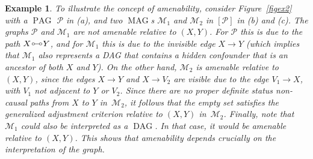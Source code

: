 \documentclass[11pt,a4paper]{article}
\newtheorem{example}{Example}
\DeclareMathOperator{\DAG}{DAG}
\DeclareMathOperator{\MAG}{MAG}
\DeclareMathOperator{\PAG}{PAG}
\newcommand{\g}[1][G]{\mathcal{#1}}
\newcommand{\circcirc}{
  \setlength{\unitlength}{1mm}
  \begin{picture}(5,1)(0,0)
    \put(1,1){\circle{1}}
    \put(1.5,1){\line(1,0){2}}
    \put(4,1){\circle{1}}
  \end{picture}
}
\begin{document}
\begin{example}
   To illustrate the concept of amenability, consider Figure~\ref{figex2} with a $\PAG$ $\g[P]$ in (a), and two $\MAG$s $\g[M]_1$ and $\g[M]_2$ in $[\g[P]]$ in (b) and (c). The graphs $\g[P]$ and $\g[M]_1$ are not amenable relative to $(X,Y)$. For $\g[P]$ this is due to the path $X \circcirc Y$, and for $\g[M]_1$ this is due to the invisible edge $X \to Y$  
   (which implies that $\g[M]_1$ also represents a DAG that contains a hidden confounder that is an ancestor of both $X$ and $Y$). On the other hand, $\g[M]_2$ is amenable relative to $(X,Y)$, since the edges $X\to Y$ and $X \to V_2$ are visible due to the edge $V_1\to X$, with $V_1$ not adjacent to $Y$ or $V_2$.
   Since there are no proper definite status non-causal paths from $X$ to $Y$ in~$\g[M]_2$, it follows that the empty set satisfies the generalized adjustment criterion relative to $(X,Y)$ in~$\g[M]_2$.
   Finally, note that $\g[M]_1$ could also be interpreted as a $\DAG$. In that case, it would be amenable relative to $(X,Y)$. This shows that amenability depends crucially on the interpretation of the graph.
   \label{ex2}
\end{example}
\end{document}
